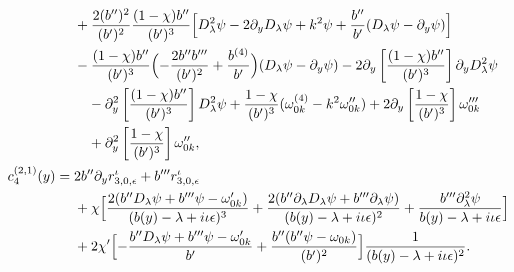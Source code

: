 \documentclass[reqno,11pt]{amsart}
\numberwithin{equation}{section}
\numberwithin{equation}{section} %
\begin{document}
\begin{enumerate}
\begin{align}
 &+\frac{2(b'')^2}{(b')^2}\frac{(1-\chi)b''}{(b')^3}
       \Bigl[D_\lambda^2\psi-2\partial_yD_\lambda\psi+k^2\psi +\frac{b''}{b'}(D_\lambda\psi-\partial_y\psi)\Bigr] \notag\\
 &-\frac{(1-\chi)b''}{(b')^3}\Bigl(-\frac{2b''b'''}{(b')^2}+\frac{b^{(4)}}{b'}\Bigr)
             (D_\lambda\psi-\partial_y\psi) -2\partial_y\left[\frac{(1-\chi)b''}{(b')^3}\right]\partial_yD_\lambda^2\psi \notag\\
 &\quad -\partial_y^2\left[\frac{(1-\chi)b''}{(b')^3}\right]D_\lambda^2\psi +\frac{1-\chi}{(b')^3}(\omega_{0k}^{(4)}-k^2\omega_{0k}'') +2\partial_y\left[\frac{1-\chi}{(b')^3}\right]\omega_{0k}''' \notag\\
 &\quad +\partial_y^2\left[\frac{1-\chi}{(b')^3}\right]\omega_{0k}'', \notag\\
 c_4^{(2,1)}(y)={}&2b''\partial_y r_{3,0,\epsilon}^{\iota}
 +b'''r_{3,0,\epsilon}^{\iota} \notag\\
 &+\chi\Bigl[\frac{2(b''D_\lambda\psi+b'''\psi-\omega_{0k}')}{(b(y)-\lambda+i\iota\epsilon)^3}+\frac{2(b''\partial_\lambda D_\lambda\psi+b'''\partial_\lambda\psi)}{(b(y)-\lambda+i\iota\epsilon)^2}+\frac{b'''\partial_\lambda^2\psi}{b(y)-\lambda+i\iota\epsilon}
       \Bigr] \notag\\
 &+2\chi'\Bigl[
       -\frac{b''D_\lambda\psi+b'''\psi-\omega_{0k}'}{b'}
       +\frac{b''(b''\psi-\omega_{0k})}{(b')^2}\Bigr] \frac{1}{(b(y)-\lambda+i\iota\epsilon)^2}.\notag
\end{align}



\end{enumerate}
\end{document}
